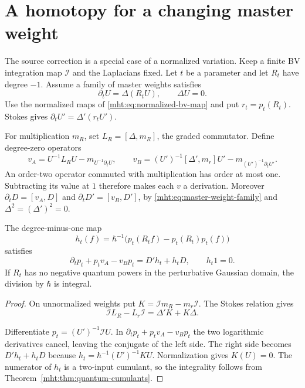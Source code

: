 \section{A homotopy for a changing master weight}

The source correction is a special case of a normalized variation.
Keep a finite BV integration map $\mathcal I$ and the Laplacians
fixed. Let $t$ be a parameter and let $R_t$ have degree $-1$.
Assume a family of master weights satisfies
\begin{equation}\label{mht:eq:master-weight-family}
 \partial_tU=\Delta(R_tU),\qquad \Delta U=0.
\end{equation}
Use the normalized maps of \eqref{mht:eq:normalized-bv-map} and put
$r_t=p_t(R_t)$. Stokes gives
$\partial_tU'=\Delta'(r_tU')$.

For multiplication $m_R$, set $L_R=[\Delta,m_R]$, the graded
commutator. Define degree-zero operators
\[
 v_A=U^{-1}L_RU-m_{U^{-1}\partial_tU},\qquad
 v_B=(U')^{-1}[\Delta',m_r]U'
                         -m_{(U')^{-1}\partial_tU'}.
\]
An order-two operator commuted with multiplication has order at
most one. Subtracting its value at $1$ therefore makes each $v$
a derivation. Moreover
$\partial_tD=[v_A,D]$ and $\partial_tD'=[v_B,D']$, by
\eqref{mht:eq:master-weight-family} and $\Delta^2=(\Delta')^2=0$.

\begin{proposition}\label{mht:prop:normalized-gauge-homotopy}
The degree-minus-one map
\[
 h_t(f)=\hbar^{-1}\bigl(p_t(R_tf)-p_t(R_t)p_t(f)\bigr)
\]
satisfies
\begin{equation}\label{mht:eq:normalized-gauge-homotopy}
 \partial_tp_t+p_tv_A-v_Bp_t=D'h_t+h_tD,\qquad h_t1=0.
\end{equation}
If $R_t$ has no negative quantum powers in the perturbative Gaussian
domain, the division by $\hbar$ is integral.
\end{proposition}

\begin{proof}
On unnormalized weights put $K=\mathcal I m_R-m_r\mathcal I$.
The Stokes relation gives
\[
 \mathcal I L_R-L_r\mathcal I=\Delta'K+K\Delta.
\]

Differentiate $p_t=(U')^{-1}\mathcal I U$. In
$\partial_tp_t+p_tv_A-v_Bp_t$ the two logarithmic derivatives
cancel, leaving the conjugate of the left side. The right side
becomes $D'h_t+h_tD$ because
$h_t=\hbar^{-1}(U')^{-1}KU$. Normalization gives $K(U)=0$.
The numerator of $h_t$ is a two-input cumulant, so the integrality
follows from Theorem~\ref{mht:thm:quantum-cumulants}.
\end{proof}

